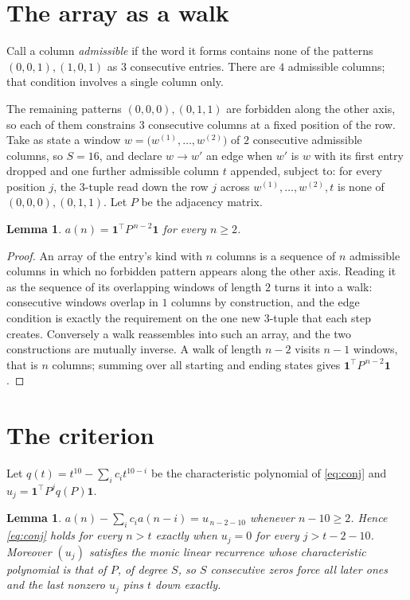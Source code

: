 \documentclass[11pt,a4paper]{article}
\theoremstyle{plain}
\newtheorem{lemma}[theorem]{Lemma}
\theoremstyle{definition}
\begin{document}
\section{The array as a walk}

Call a column \emph{admissible} if the word it forms contains none of the patterns
$(0,0,1), (1,0,1)$ as $3$ consecutive entries. There are $4$ admissible columns; that condition
involves a single column only.

The remaining patterns $(0,0,0), (0,1,1)$ are forbidden along the other axis, so each of them
constrains $3$ consecutive columns at a fixed position of the row. Take as state a
window $w=\bigl(w^{(1)},\dots,w^{(2)}\bigr)$ of $2$ consecutive admissible
columns, so $S=16$, and declare $w\to w'$ an edge when $w'$ is $w$ with its first entry
dropped and one further admissible column $t$ appended, subject to: for every position
$j$, the $3$-tuple read down the row $j$ across $w^{(1)},\dots,w^{(2)},t$
is none of $(0,0,0), (0,1,1)$. Let $P$ be the adjacency matrix.

\begin{lemma}\label{lem:walk}
$a(n)=\mathbf{1}^{\!\top}P^{\,n-2}\mathbf{1}$ for every $n\ge2$.
\end{lemma}

\begin{proof}
An array of the entry's kind with $n$ columns is a sequence of $n$ admissible columns in
which no forbidden pattern appears along the other axis. Reading it as the sequence of its
overlapping windows of length $2$ turns it into a walk: consecutive windows overlap in
$1$ columns by construction, and the edge condition is exactly the requirement on the one
new $3$-tuple that each step creates. Conversely a walk reassembles into such an array,
and the two constructions are mutually inverse. A walk of length $n-2$ visits $n-1$
windows, that is $n$ columns; summing over all starting and ending states gives
$\mathbf{1}^{\!\top}P^{\,n-2}\mathbf{1}$.
\end{proof}

\section{The criterion}

Let $q(t)=t^{10}-\sum_i c_i t^{10-i}$ be the characteristic polynomial of
\eqref{eq:conj} and $u_j=\mathbf{1}^{\!\top}P^{j}q(P)\mathbf{1}$.

\begin{lemma}\label{lem:crit}
$a(n)-\sum_i c_i a(n-i)=u_{\,n-2-10}$ whenever $n-10\ge2$. Hence
\eqref{eq:conj} holds for every $n>t$ exactly when $u_j=0$ for every
$j>t-2-10$. Moreover $(u_j)$ satisfies the monic linear recurrence whose
characteristic polynomial is that of $P$, of degree $S$, so $S$ consecutive zeros force all
later ones and the last nonzero $u_j$ pins $t$ down exactly.
\end{lemma}
\end{document}
